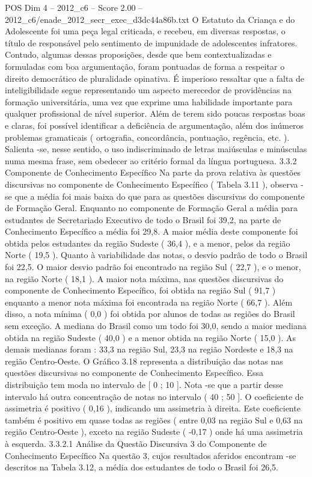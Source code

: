 \begin{textsample}{POS Dim 4 – 2012\_c6 – Score 2.00 – 2012\_c6/enade\_2012\_secr\_exec\_d3dc44a86b.txt}
O Estatuto da Criança e do Adolescente foi uma peça legal criticada, e recebeu, em diversas respostas, o título de responsável pelo sentimento de impunidade de adolescentes infratores.
Contudo, algumas dessas proposições, desde que bem contextualizadas e formuladas com boa argumentação, foram pontuadas de forma a respeitar o direito democrático de pluralidade opinativa.
É imperioso ressaltar que a falta de inteligibilidade segue representando um aspecto merecedor de providências na formação universitária, uma vez que exprime uma habilidade importante para qualquer profissional de nível superior.
Além de terem sido poucas respostas boas e claras, foi possível identificar a deficiência de argumentação, além dos inúmeros problemas gramaticais ( ortografia, concordância, pontuação, regência, etc. ).
Salienta -se, nesse sentido, o uso indiscriminado de letras maiúsculas e minúsculas numa mesma frase, sem obedecer ao critério formal da língua portuguesa. 3.3.2 Componente de Conhecimento Específico Na parte da prova relativa às questões discursivas no componente de Conhecimento Específico ( Tabela 3.11 ), observa -se que a média foi mais baixa do que para as questões discursivas do componente de Formação Geral.
Enquanto no componente de Formação Geral a média para estudantes de Secretariado Executivo de todo o Brasil foi 39,2, na parte de Conhecimento Específico a média foi 29,8.
A maior média deste componente foi obtida pelos estudantes da região Sudeste ( 36,4 ), e a menor, pelos da região Norte ( 19,5 ).
Quanto à variabilidade das notas, o desvio padrão de todo o Brasil foi 22,5.
O maior desvio padrão foi encontrado na região Sul ( 22,7 ), e o menor, na região Norte ( 18,1 ).
A maior nota máxima, nas questões discursivas do componente de Conhecimento Específico, foi obtida na região Sul ( 91,7 ) enquanto a menor nota máxima foi encontrada na região Norte ( 66,7 ).
Além disso, a nota mínima ( 0,0 ) foi obtida por alunos de todas as regiões do Brasil sem exceção.
A mediana do Brasil como um todo foi 30,0, sendo a maior mediana obtida na região Sudeste ( 40,0 ) e a menor obtida na região Norte ( 15,0 ).
As demais medianas foram : 33,3 na região Sul, 23,3 na região Nordeste e 18,3 na região Centro-Oeste.
O Gráfico 3.18 representa a distribuição das notas nas questões discursivas no componente de Conhecimento Específico.
Essa distribuição tem moda no intervalo de [ 0 ; 10 ].
Nota -se que a partir desse intervalo há outra concentração de notas no intervalo ( 40 ; 50 ].
O coeficiente de assimetria é positivo ( 0,16 ), indicando um assimetria à direita.
Este coeficiente também é positivo em quase todas as regiões ( entre 0,03 na região Sul e 0,63 na região Centro-Oeste ), exceto na região Sudeste ( -0,17 ) onde há uma assimetria à esquerda. 3.3.2.1 Análise da Questão Discursiva 3 do Componente de Conhecimento Específico Na questão 3, cujos resultados aferidos encontram -se descritos na Tabela 3.12, a média dos estudantes de todo o Brasil foi 26,5.

\end{textsample}
